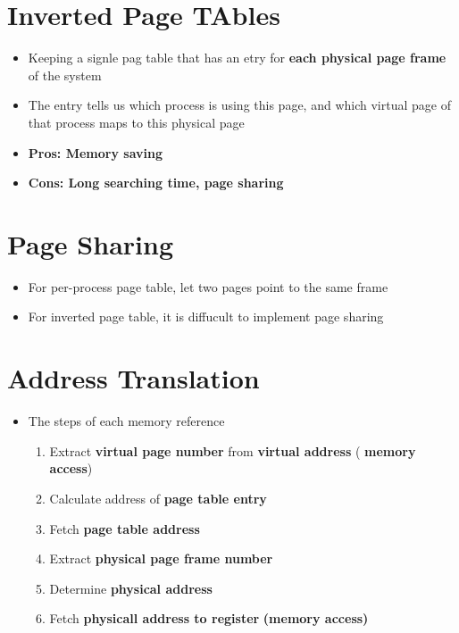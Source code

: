 \documentclass[a4paper,11pt,english]{article}
\begin{document}
\section*{Inverted Page TAbles}
\begin{itemize}
    \item Keeping a signle pag table that has an etry for \textbf{\color{blue} each physical page frame} of the system
    \item The entry tells us which process is using this page, and which virtual page of that process maps to this physical page
    \item \textbf{\color{blue} Pros: Memory saving}
    \item \textbf{\color{red} Cons: Long searching time, page sharing}
\end{itemize}

\section*{Page Sharing}
\begin{itemize}
    \item For per-process page table, let two pages point to the same frame
    \item For inverted page table, it is diffucult to implement page sharing
\end{itemize}

\section*{Address Translation}
\begin{itemize}
    \item The steps of each memory reference
        \begin{enumerate}
            \item Extract \textbf{\color{blue} virtual page number} from \textbf{\color{blue} virtual address} (\textbf{\color{red} memory access})
            \item Calculate address of \textbf{\color{blue} page table entry}
            \item Fetch \textbf{\color{blue} page table address}
            \item Extract \textbf{\color{blue} physical page frame number}
            \item Determine \textbf{\color{blue} physical address}
            \item Fetch \textbf{\color{blue} physicall address to register} \textbf{\color{red} (memory access)}
        \end{enumerate}
\end{itemize}
\end{document}
